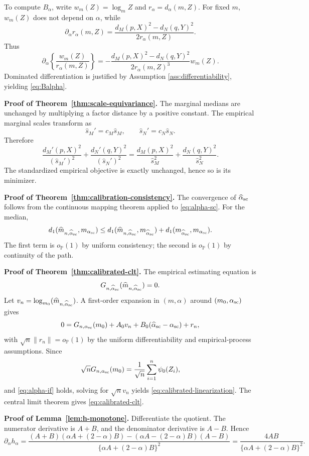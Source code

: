 \documentclass[11pt]{article}
\newcommand{\Pbb}{\mathbb P}
\newcommand{\1}{\mathbf{1}}
\begin{document}
To compute $B_\alpha$, write $w_m(Z)=\log_mZ$ and $r_\alpha=d_\alpha(m,Z)$.  For fixed $m$, $w_m(Z)$ does not depend on $\alpha$, while
\[
 \partial_\alpha r_\alpha(m,Z)
 =
 \frac{d_M(p,X)^2-d_N(q,Y)^2}{2r_\alpha(m,Z)}.
\]
Thus
\[
 \partial_\alpha\left\{\frac{w_m(Z)}{r_\alpha(m,Z)}\right\}
 =
 -\frac{d_M(p,X)^2-d_N(q,Y)^2}{2r_\alpha(m,Z)^3}w_m(Z).
\]
Dominated differentiation is justified by Assumption \ref{ass:differentiability}, yielding \eqref{eq:Balpha}.


\medskip
\noindent \textbf{Proof of Theorem~\ref{thm:scale-equivariance}.}
The marginal medians are unchanged by multiplying a factor distance by a positive constant.  The empirical marginal scales transform as
\[
 \widehat s_M'=c_M\widehat s_M,
 \qquad
 \widehat s_N'=c_N\widehat s_N.
\]
Therefore
\[
 \frac{d_M'(p,X)^2}{(\widehat s_M')^2}
 +
 \frac{d_N'(q,Y)^2}{(\widehat s_N')^2}
 =
 \frac{d_M(p,X)^2}{\widehat s_M^2}
 +
 \frac{d_N(q,Y)^2}{\widehat s_N^2}.
\]
The standardized empirical objective is exactly unchanged, hence so is its minimizer.





\medskip 
\noindent \textbf{Proof of Theorem~\ref{thm:calibration-consistency}.}
The convergence of $\widehat\alpha_{\rm sc}$ follows from the continuous mapping theorem applied to \eqref{eq:alpha-sc}.  For the median,
\[
 d_1(\widehat m_{n,\widehat\alpha_{\rm sc}},m_{\alpha_{\rm sc}})
 \le
 d_1(\widehat m_{n,\widehat\alpha_{\rm sc}},m_{\widehat\alpha_{\rm sc}})
 +
 d_1(m_{\widehat\alpha_{\rm sc}},m_{\alpha_{\rm sc}}).
\]
The first term is $o_{\Pbb}(1)$ by uniform consistency; the second is $o_{\Pbb}(1)$ by continuity of the path.

\medskip
\noindent \textbf{Proof of Theorem~\ref{thm:calibrated-clt}.}
The empirical estimating equation is
\[
 G_{n,\widehat\alpha_{\rm sc}}(\widehat m_{n,\widehat\alpha_{\rm sc}})=0.
\]
Let $v_n=\log_{m_0}(\widehat m_{n,\widehat\alpha_{\rm sc}})$.  A first-order expansion in $(m,\alpha)$ around $(m_0,\alpha_{\rm sc})$ gives
\[
 0=
 G_{n,\alpha_{\rm sc}}(m_0)
 +A_0v_n
 +B_0(\widehat\alpha_{\rm sc}-\alpha_{\rm sc})
 +r_n,
\]
with $\sqrt n\|r_n\|=o_{\Pbb}(1)$ by the uniform differentiability and empirical-process assumptions.  Since
\[
 \sqrt nG_{n,\alpha_{\rm sc}}(m_0)
 =\frac1{\sqrt n}\sum_{i=1}^n\psi_0(Z_i),
\]
and \eqref{eq:alpha-if} holds, solving for $\sqrt n v_n$ yields \eqref{eq:calibrated-linearization}.  The central limit theorem gives \eqref{eq:calibrated-clt}.

\medskip 
\noindent \textbf{Proof of Lemma~\ref{lem:h-monotone}.}
Differentiate the quotient.  The numerator derivative is $A+B$, and the denominator derivative is $A-B$.  Hence
\[
 \partial_\alpha h_\alpha
 =
 \frac{(A+B)(\alpha A+(2-\alpha)B)-(\alpha A-(2-\alpha)B)(A-B)}{\{\alpha A+(2-\alpha)B\}^2}
 =
 \frac{4AB}{\{\alpha A+(2-\alpha)B\}^2}.
\]
\end{document}
